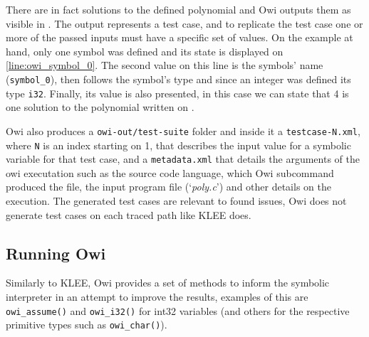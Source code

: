 There are in fact solutions to the defined polynomial and Owi outputs them as visible in . The output represents a test case, and to replicate the test case one or more of the passed inputs must have a specific set of values. On the example at hand, only one symbol was defined and its state is displayed on \cref{line:owi_symbol_0}. The second value on this line is the symbols' name (\lstinline$symbol_0$), then follows the symbol's type and since an integer was defined its type \lstinline$i32$. Finally, its value is also presented, in this case we can state that 4 is one solution to the polynomial written on .

Owi also produces a \lstinline$owi-out/test-suite$ folder and inside it a \lstinline$testcase-N.xml$, where \lstinline$N$ is an index starting on 1, that describes the input value for a symbolic variable for that test case, and a \lstinline$metadata.xml$ that details the arguments of the owi executation such as the source code language, which Owi subcommand produced the file, the input program file (`\textit{poly.c}') and other details on the execution. The generated test cases are relevant to found issues, Owi does not generate test cases on each traced path like KLEE does.

\noindent\begin{minipage}{\linewidth}

\end{minipage}



\subsection{Running Owi}

Similarly to KLEE, Owi provides a set of methods to inform the symbolic interpreter in an attempt to improve the results, examples of this are \lstinline{owi_assume()} and \lstinline{owi_i32()} for int32 variables (and others for the respective primitive types such as \lstinline{owi_char()}).

